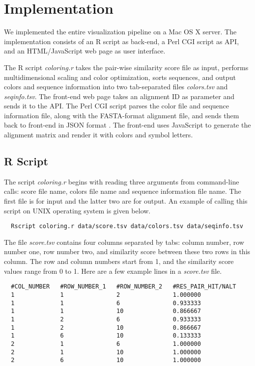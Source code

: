 \chapter{Implementation}\label{chap:Implementation}

We implemented the entire visualization pipeline on a Mac OS X server. The implementation consists of an R script as back-end, a Perl CGI script as API, and an HTML/JavaScript web page as user interface.

The R script \emph{coloring.r} takes the pair-wise similarity score file as input, performs multidimensional scaling and color optimization, sorts sequences, and output colors and sequence information into two tab-separated files \emph{colors.tsv} and \emph{seqinfo.tsv}. The front-end web page takes an alignment ID as parameter and sends it to the API. The Perl CGI script parses the color file and sequence information file, along with the FASTA-format alignment file, and sends them back to front-end in JSON format \cite{crockford2006application}. The front-end uses JavaScript to generate the alignment matrix and render it with colors and symbol letters.

\section{R Script}

The script \emph{coloring.r} begins with reading three arguments from command-line calls: score file name, colors file name and sequence information file name. The first file is for input and the latter two are for output. An example of calling this script on UNIX operating system is given below.
\begin{verbatim}
  Rscript coloring.r data/score.tsv data/colors.tsv data/seqinfo.tsv
\end{verbatim}

The file \emph{score.tsv} contains four columns separated by tabs: column number, row number one, row number two, and similarity score between these two rows in this column. The row and column numbers start from 1, and the similarity score values range from 0 to 1. Here are a few example lines in a \emph{score.tsv} file.
\def\baselinestretch{1}
\begin{verbatim}
  #COL_NUMBER   #ROW_NUMBER_1   #ROW_NUMBER_2   #RES_PAIR_HIT/NALT
  1             1               2               1.000000
  1             1               6               0.933333
  1             1               10              0.866667
  1             2               6               0.933333
  1             2               10              0.866667
  1             6               10              0.133333
  2             1               6               1.000000
  2             1               10              1.000000
  2             6               10              1.000000
\end{verbatim}

